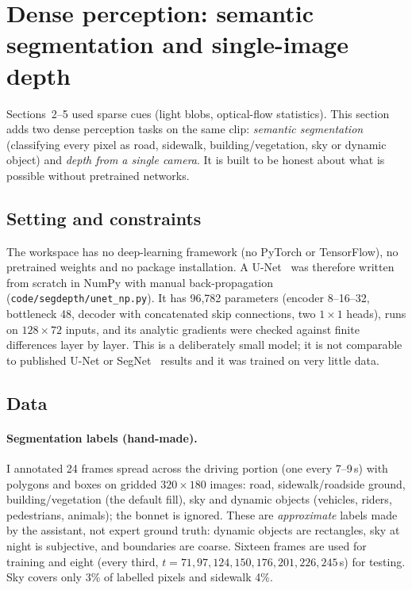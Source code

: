 \section{Dense perception: semantic segmentation and single-image depth}\label{sec:segdepth}
Sections~2--5 used sparse cues (light blobs, optical-flow statistics). This section adds two dense perception tasks on the same clip: \emph{semantic segmentation} (classifying every pixel as road, sidewalk, building/vegetation, sky or dynamic object) and \emph{depth from a single camera}. It is built to be honest about what is possible without pretrained networks.

\subsection{Setting and constraints}
The workspace has no deep-learning framework (no PyTorch or TensorFlow), no pretrained weights and no package installation. A U-Net~\cite{unet} was therefore written from scratch in NumPy with manual back-propagation (\texttt{code/segdepth/unet\_np.py}). It has 96{,}782 parameters (encoder 8--16--32, bottleneck 48, decoder with concatenated skip connections, two $1\times1$ heads), runs on $128\times72$ inputs, and its analytic gradients were checked against finite differences layer by layer. This is a deliberately small model; it is not comparable to published U-Net or SegNet~\cite{segnet} results and it was trained on very little data.

\subsection{Data}
\paragraph{Segmentation labels (hand-made).} I annotated 24 frames spread across the driving portion (one every 7--9\,s) with polygons and boxes on gridded $320\times180$ images: road, sidewalk/roadside ground, building/vegetation (the default fill), sky and dynamic objects (vehicles, riders, pedestrians, animals); the bonnet is ignored. These are \emph{approximate} labels made by the assistant, not expert ground truth: dynamic objects are rectangles, sky at night is subjective, and boundaries are coarse. Sixteen frames are used for training and eight (every third, $t=71,97,124,150,176,201,226,245$\,s) for testing. Sky covers only 3\% of labelled pixels and sidewalk 4\%.

